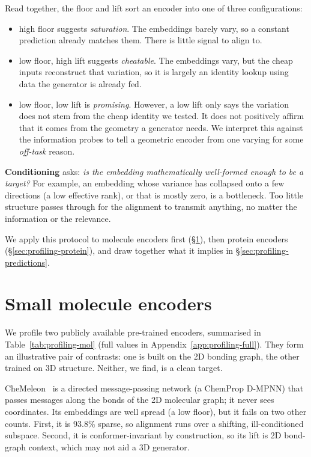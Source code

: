 \documentclass[12pt,a4paper,twoside]{report}
\begin{document}
Read together, the floor and lift sort an encoder into one of three configurations:
\begin{itemize}[topsep=2pt,itemsep=1pt]
  \item high floor suggests \emph{saturation}. The embeddings barely vary, so a constant prediction already matches them. There is little signal to align to.
  \item low floor, high lift suggests \emph{cheatable}. The embeddings vary, but the cheap inputs reconstruct that variation, so it is largely an identity lookup using data the generator is already fed.
  \item low floor, low lift is \emph{promising}. However, a low lift only says the variation does not stem from the cheap identity we tested. It does not positively affirm that it comes from the geometry a generator needs. We interpret this against the information probes to tell a geometric encoder from one varying for some \emph{off-task} reason.
\end{itemize}

\textbf{Conditioning} asks: \emph{is the embedding mathematically well-formed enough to be a target?} For example, an embedding whose variance has collapsed onto a few directions (a low effective rank), or that is mostly zero, is a bottleneck. Too little structure passes through for the alignment to transmit anything, no matter the information or the relevance.

We apply this protocol to molecule encoders first (\S\ref{sec:profiling-mol}), then protein encoders (\S\ref{sec:profiling-protein}), and draw together what it implies in \S\ref{sec:profiling-predictions}.

\section{Small molecule encoders}
\label{sec:profiling-mol}



We profile two publicly available pre-trained encoders, summarised in Table~\ref{tab:profiling-mol} (full values in Appendix~\ref{app:profiling-full}). They form an illustrative pair of contrasts: one is built on the 2D bonding graph, the other trained on 3D structure. Neither, we find, is a clean target.

CheMeleon~\cite{CheMeleon} is a directed message-passing network (a ChemProp D-MPNN) that passes messages along the bonds of the 2D molecular graph; it never sees coordinates. Its embeddings are well spread (a low floor), but it fails on two other counts. First, it is 93.8\% sparse, so alignment runs over a shifting, ill-conditioned subspace. Second, it is conformer-invariant by construction, so its lift is 2D bond-graph context, which may not aid a 3D generator.
\end{document}
